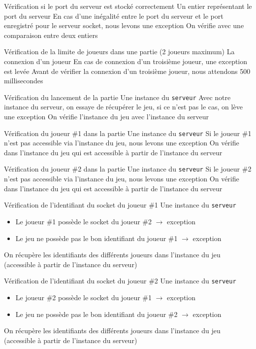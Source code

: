 \mytest
{Vérification si le port du serveur est stocké correctement}
{Un entier représentant le port du serveur}
{En cas d'une inégalité entre le port du serveur et le port enregistré pour le serveur socket, nous levons une exception}
{On vérifie avec une comparaison entre deux entiers}

\mytest
{Vérification de la limite de joueurs dans une partie (2 joueurs maximum)}
{La connexion d'un joueur}
{En cas de connexion d'un troisième joueur, une exception est levée}
{Avant de vérifier la connexion d'un troisième joueur, nous attendons 500 millisecondes}

\mytest
{Vérification du lancement de la partie}
{Une instance du \texttt{serveur}}
{Avec notre instance du serveur, on essaye de récupérer le jeu, si ce n'est pas le cas, on lève une exception}
{On vérifie l'instance du jeu avec l'instance du serveur}

\mytest
{Vérification du joueur \#1 dans la partie}
{Une instance du \texttt{serveur}}
{Si le joueur \#1 n'est pas accessible via l'instance du jeu, nous levons une exception}
{On vérifie dans l'instance du jeu qui est accessible à partir de l'instance du serveur}

\mytest
{Vérification du joueur \#2 dans la partie}
{Une instance du \texttt{serveur}}
{Si le joueur \#2 n'est pas accessible via l'instance du jeu, nous levons une exception}
{On vérifie dans l'instance du jeu qui est accessible à partir de l'instance du serveur}

\mytest
{Vérification de l'identifiant du socket du joueur \#1}
{Une instance du \texttt{serveur}}
{
    \begin{itemize}
        \item Le joueur \#1 possède le socket du joueur \#2 $\rightarrow$ exception
        \item Le jeu ne possède pas le bon identifiant du joueur \#1 $\rightarrow$ exception
    \end{itemize}
}
{On récupère les identifiants des différents joueurs dans l'instance du jeu (accessible à partir de l'instance du serveur)}

\mytest
{Vérification de l'identifiant du socket du joueur \#2}
{Une instance du \texttt{serveur}}
{
    \begin{itemize}
        \item Le joueur \#2 possède le socket du joueur \#1 $\rightarrow$ exception
        \item Le jeu ne possède pas le bon identifiant du joueur \#2 $\rightarrow$ exception
    \end{itemize}
}
{On récupère les identifiants des différents joueurs dans l'instance du jeu (accessible à partir de l'instance du serveur)}

